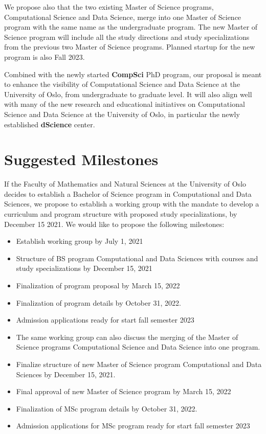 \documentclass[oneside,final,10pt]{article}
\begin{document}
We propose also that the two existing Master of Science programs, Computational Science and Data Science, merge into one Master of Science program with the same name as the undergraduate program. The new Master of Science program will include all the study directions and study specializations from the previous two Master of Science programs. Planned startup for the new program is also Fall 2023. 

Combined with the newly started {\bf CompSci} PhD program, our proposal is meant to enhance the visibility of Computational Science and Data Science at the University of Oslo, from undergraduate to graduate level. It will also align well with many of the new research and educational initiatives on Computational Science and Data Science at the University of Oslo, in particular the newly established {\bf dScience} center. 
\section*{Suggested Milestones}
If the Faculty of Mathematics and Natural Sciences at the University of Oslo decides to establish a Bachelor of Science program in Computational  and Data Sciences, we propose to establish a working group with the mandate  to develop a curriculum and program structure with proposed study specializations, by December 15 2021.  We would like to propose the following milestones:
\begin{itemize}
    \item Establish working group by July 1, 2021
    \item Structure of BS program Computational and Data Sciences with courses and study specializations by December 15, 2021
    \item Finalization of program proposal by March 15, 2022
    \item Finalization of program details by October 31, 2022.
    \item Admission applications ready for start fall semester 2023
    \item The same working group can also discuss the merging of the Master of Science programs Computational Science and Data Science into one program. 
    \item Finalize structure of new Master of Science program Computational and Data Sciences by December 15, 2021.
    \item Final approval of new Master of Science program by March 15, 2022
    \item Finalization of MSc program details by October 31, 2022.
    \item Admission applications for MSc program ready for start fall semester 2023
\end{itemize}
\end{document}
